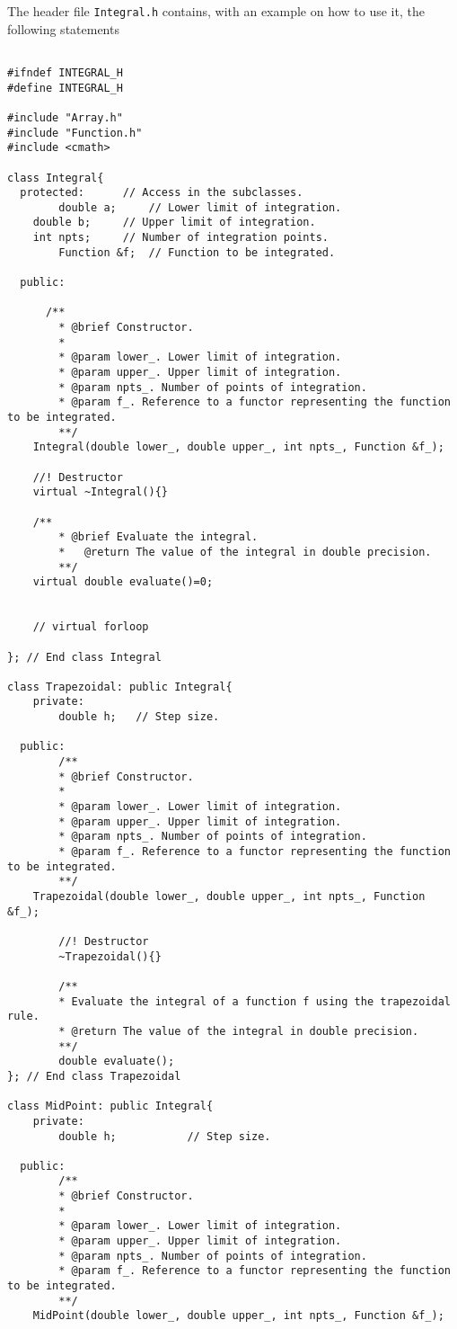 The header file \lstinline{Integral.h} contains, with an example on how to use
it, the following statements
\begin{lstlisting}[title={\url{http://folk.uio.no/mhjensen/compphys/programs/chapter05/cpp/Integral.h}}]

#ifndef INTEGRAL_H
#define INTEGRAL_H

#include "Array.h"
#include "Function.h"
#include <cmath>

class Integral{
  protected:      // Access in the subclasses.
		double a;     // Lower limit of integration.
    double b;     // Upper limit of integration.
    int npts;     // Number of integration points.
		Function &f;  // Function to be integrated. 
			   
  public:
		 		
	  /**
		* @brief Constructor.
		*
		* @param lower_. Lower limit of integration.
		* @param upper_. Upper limit of integration.
		* @param npts_. Number of points of integration.
		* @param f_. Reference to a functor representing the function to be integrated.
		**/
    Integral(double lower_, double upper_, int npts_, Function &f_);

    //! Destructor
    virtual ~Integral(){}

    /**
		* @brief Evaluate the integral.
		*	@return The value of the integral in double precision.
		**/
    virtual double evaluate()=0;

		
    // virtual forloop

}; // End class Integral

class Trapezoidal: public Integral{
	private:
		double h; 	// Step size.
		
  public:
		/**
		* @brief Constructor.
		*
		* @param lower_. Lower limit of integration.
		* @param upper_. Upper limit of integration.
		* @param npts_. Number of points of integration.
		* @param f_. Reference to a functor representing the function to be integrated.
		**/
    Trapezoidal(double lower_, double upper_, int npts_, Function &f_);

		//! Destructor
		~Trapezoidal(){}
    
		/** 
		* Evaluate the integral of a function f using the trapezoidal rule.
		* @return The value of the integral in double precision.
		**/
		double evaluate();
}; // End class Trapezoidal

class MidPoint: public Integral{
	private:
		double h;			// Step size.

  public:
		/**
		* @brief Constructor.
		*
		* @param lower_. Lower limit of integration.
		* @param upper_. Upper limit of integration.
		* @param npts_. Number of points of integration.
		* @param f_. Reference to a functor representing the function to be integrated.
		**/
    MidPoint(double lower_, double upper_, int npts_, Function &f_);
    

\end{lstlisting}
